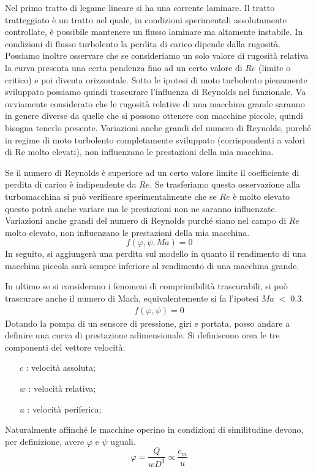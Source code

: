 Nel primo tratto di legame lineare si ha una corrente laminare. Il tratto tratteggiato è un tratto nel quale, in condizioni sperimentali assolutamente controllate, è possibile mantenere un flusso laminare ma altamente instabile. In condizioni di flusso turbolento la perdita di carico dipende dalla rugosità.
Possiamo inoltre osservare che se consideriamo un solo valore di rugosità relativa la curva presenta una certa pendenza fino ad un certo valore di $Re$ (limite o critico) e poi diventa orizzontale. Sotto le ipotesi di moto turbolento pienamente sviluppato possiamo quindi trascurare l’influenza di Reynolds nel funzionale. Va ovviamente considerato che le rugosità relative di una macchina grande saranno in genere diverse da quelle che si possono ottenere con macchine piccole, quindi bisogna tenerlo presente. Variazioni anche grandi del numero di Reynolds, purché in regime di moto turbolento completamente sviluppato (corrispondenti a valori di Re molto elevati), non influenzano le prestazioni della mia macchina.

Se il numero di Reynolds è superiore ad un certo valore limite il coefficiente di perdita di carico è indipendente da $Re$. Se trasferiamo questa osservazione alla turbomacchina si può verificare sperimentalmente che se $Re$ è molto elevato questo potrà anche variare ma le prestazioni non ne saranno influenzate. Variazioni anche grandi del numero di Reynolds purché siano nel
campo di $Re$ molto elevato, non influenzano le prestazioni della mia macchina.
\begin{equation}
f(\varphi,\psi,Ma)=0
\end{equation}
In seguito, si aggiungerà una perdita sul modello in quanto il rendimento di una macchina piccola sarà sempre inferiore al rendimento di una macchina grande.

In ultimo se si considerano i fenomeni di comprimibilità trascurabili, si può trascurare anche il numero di Mach, equivalentemente si fa l'ipotesi $Ma\;<\;0.3$.
\begin{align*}
f(\varphi,\psi)=0
\end{align*}
Dotando la pompa di un sensore di pressione, giri e portata, posso andare a definire una curva di prestazione adimensionale.
Si definiscono orea le tre componenti del vettore velocità:
\begin{itemize}
\item[$c$]: velocità assoluta;
\item[$w$]: velocità relativa;
\item[$u$]: velocità periferica;
\end{itemize}
Naturalmente affinché le macchine operino in condizioni di similitudine devono, per definizione, avere $\varphi$ e $\psi$ uguali. 
\begin{equation}
\varphi=\frac{Q}{w D^3} \propto \frac{c_m}{u}
\end{equation}

